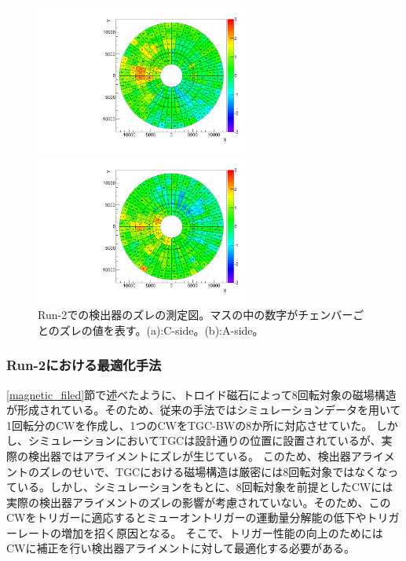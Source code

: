 \begin{figure}
    \begin{minipage}[tb]{0.4\linewidth}
        \hspace*{-0.5cm}
        \centering
        \includegraphics[clip, width=7cm]{fig/3/TGCAlign_CW.muon.bias.20160606.v1.C-side.pdf}
        \subcaption{}
    \end{minipage}
    \hfill
    \begin{minipage}[tb]{0.4\linewidth}
        \centering
        \hspace*{-1cm}
        \includegraphics[clip, width=7cm]{fig/3/TGCAlign_CW.muon.bias.20160606.v1.A-side.pdf}
        \subcaption{}
    \end{minipage}
    \caption{Run-2での検出器のズレの測定図。マスの中の数字がチェンバーごとのズレの値を表す。(a):C-side。(b):A-side。}
    \label{fig:ズレ}
\end{figure}


\subsubsection{Run-2における最適化手法}
\ref{magnetic_filed}節で述べたように、トロイド磁石によって8回転対象の磁場構造が形成されている。そのため、従来の手法ではシミュレーションデータを用いて1回転分のCWを作成し、1つのCWをTGC-BWの8か所に対応させていた。
しかし、シミュレーションにおいてTGCは設計通りの位置に設置されているが、実際の検出器ではアライメントにズレが生じている。
このため、検出器アライメントのズレのせいで、TGCにおける磁場構造は厳密には8回転対象ではなくなっている。しかし、シミュレーションをもとに、8回転対象を前提としたCWには実際の検出器アライメントのズレの影響が考慮されていない。そのため、このCWをトリガーに適応するとミューオントリガーの運動量分解能の低下やトリガーレートの増加を招く原因となる。
そこで、トリガー性能の向上のためにはCWに補正を行い検出器アライメントに対して最適化する必要がある。

